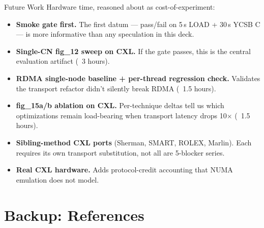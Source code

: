 \begin{frame}{Future Work}
\small Hardware time, reasoned about as cost-of-experiment:
\vspace{0.3em}
\begin{itemize}[nosep]
    \item \textbf{Smoke gate first.} The first datum --- pass/fail on 5\,s LOAD + 30\,s YCSB C --- is more informative than any speculation in this deck.
    \item \textbf{Single-CN fig\_12 sweep on CXL.} If the gate passes, this is the central evaluation artifact (~3 hours).
    \item \textbf{RDMA single-node baseline + per-thread regression check.} Validates the transport refactor didn't silently break RDMA (~1.5 hours).
    \item \textbf{fig\_15a/b ablation on CXL.} Per-technique deltas tell us which optimizations remain load-bearing when transport latency drops 10$\times$ (~1.5 hours).
    \item \textbf{Sibling-method CXL ports} (Sherman, SMART, ROLEX, Marlin). Each requires its own transport substitution, not all are 5-blocker series.
    \item \textbf{Real CXL hardware.} Adds protocol-credit accounting that NUMA emulation does not model.
\end{itemize}
\end{frame}

\section{Backup: References}

